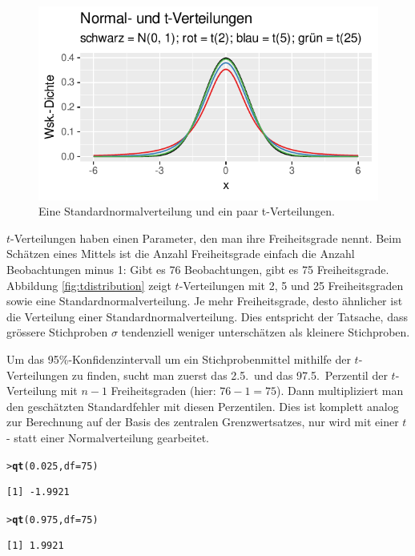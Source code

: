 \documentclass[oneside, 10pt]{book}\usepackage[]{graphicx}\usepackage[]{xcolor}
\makeatletter
\newcommand{\hlnum}[1]{\textcolor[rgb]{0.686,0.059,0.569}{#1}}%
\newcommand{\hlstd}[1]{\textcolor[rgb]{0.345,0.345,0.345}{#1}}%
\newcommand{\hlkwc}[1]{\textcolor[rgb]{0.333,0.667,0.333}{#1}}%
\newcommand{\hlkwd}[1]{\textcolor[rgb]{0.737,0.353,0.396}{\textbf{#1}}}%
\newenvironment{kframe}{%
 \def\at@end@of@kframe{}%
 \ifinner\ifhmode%
  \def\at@end@of@kframe{\end{minipage}}%
  \begin{minipage}{\columnwidth}%
 \fi\fi%
 \def\FrameCommand##1{\hskip\@totalleftmargin \hskip-\fboxsep
 \colorbox{shadecolor}{##1}\hskip-\fboxsep
     \hskip-\linewidth \hskip-\@totalleftmargin \hskip\columnwidth}%
 \MakeFramed {\advance\hsize-\width
   \@totalleftmargin\z@ \linewidth\hsize
   \@setminipage}}%
 {\par\unskip\endMakeFramed%
 \at@end@of@kframe}
\newenvironment{knitrout}{}{} %
\makeatother
\begin{document}
\begin{knitrout}
\color{fgcolor}\begin{figure}[tp]

{\centering \includegraphics[width=.5\textwidth]{figs/unnamed-chunk-154-1} 

}

\caption{Eine Standardnormalverteilung und ein paar t-Verteilungen.\label{fig:tdistribution}}\label{fig:unnamed-chunk-154}
\end{figure}

\end{knitrout}

$t$-Verteilungen haben einen Parameter,
den man ihre Freiheitsgrade nennt.
Beim Schätzen eines Mittels ist die Anzahl Freiheitsgrade einfach
die Anzahl Beobachtungen minus 1: Gibt es 76 Beobachtungen,
gibt es 75 Freiheitsgrade. Abbildung \ref{fig:tdistribution} zeigt
$t$-Ver\-teil\-ung\-en mit 2, 5 und 25 Freiheitsgraden sowie
eine Standardnormalverteilung. Je mehr Freiheitsgrade,
desto ähnlicher ist die Verteilung einer Standardnormalverteilung.
Dies entspricht der Tatsache, dass grössere Stichproben $\sigma$
tendenziell weniger unterschätzen als kleinere Stichproben.

Um das 95\%-Konfidenzintervall um ein Stichprobenmittel mithilfe
der $t$-Verteilungen zu finden, sucht man zuerst das 2.5.\ und das
97.5.\ Perzentil der $t$-Verteilung mit $n-1$ Freiheitsgraden
(hier: $76-1=75$). Dann multipliziert man den geschätzten Standardfehler
mit diesen Perzentilen. Dies ist komplett analog zur Berechnung
auf der Basis des zentralen Grenzwertsatzes, nur wird mit einer
$t$- statt einer Normalverteilung gearbeitet.
\begin{knitrout}
\color{fgcolor}\begin{kframe}
\begin{alltt}
\hlstd{> }\hlkwd{qt}\hlstd{(}\hlnum{0.025}\hlstd{,} \hlkwc{df} \hlstd{=} \hlnum{75}\hlstd{)}
\end{alltt}
\begin{verbatim}
[1] -1.9921
\end{verbatim}
\begin{alltt}
\hlstd{> }\hlkwd{qt}\hlstd{(}\hlnum{0.975}\hlstd{,} \hlkwc{df} \hlstd{=} \hlnum{75}\hlstd{)}
\end{alltt}
\begin{verbatim}
[1] 1.9921
\end{verbatim}
\end{kframe}
\end{knitrout}
\end{document}
